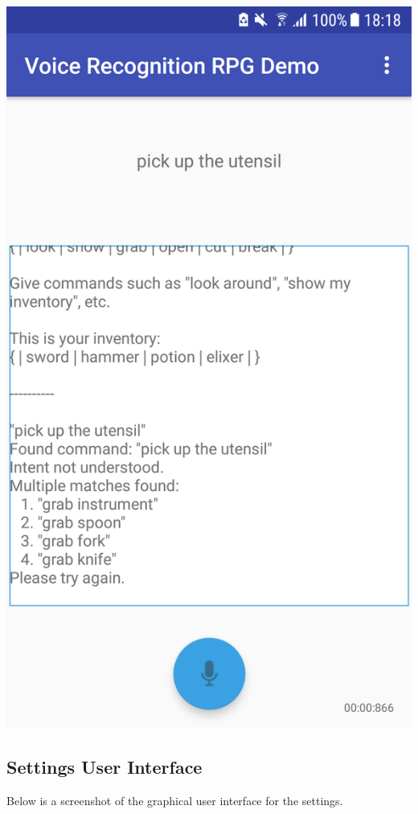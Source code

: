 \documentclass[11pt]{article}
\begin{document}
\begin{appendices}
\begin{center}
\includegraphics[scale=0.25]{utensil-3.png}
\end{center}

\newpage
\subsection{Settings User Interface}
\label{appendix:settings}
Below is a screenshot of the graphical user interface for the settings.


\end{appendices}
\end{document}
